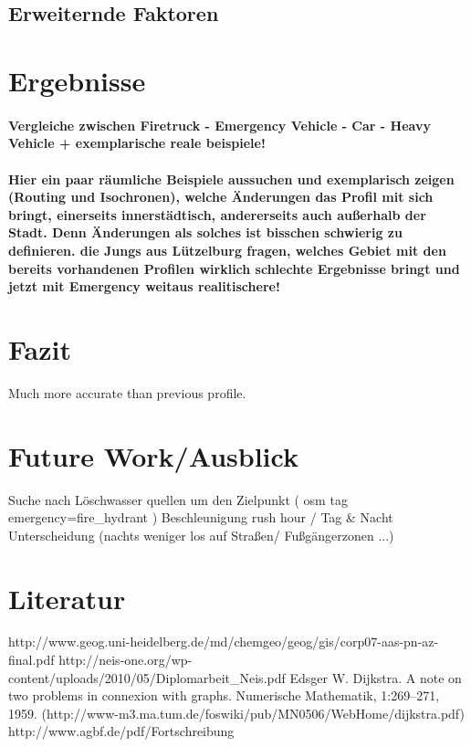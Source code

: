 \documentclass[10pt,a4paper]{article}
\begin{document}
\subsection{Erweiternde Faktoren}

\section{Ergebnisse}
\paragraph{
Vergleiche zwischen Firetruck - Emergency Vehicle - Car - Heavy Vehicle
+ exemplarische reale beispiele!
}
\paragraph{
\color{red}
Hier ein paar räumliche Beispiele aussuchen und exemplarisch zeigen (Routing und Isochronen), welche Änderungen das Profil mit sich bringt, einerseits innerstädtisch, andererseits auch außerhalb der Stadt. Denn Änderungen als solches ist bisschen schwierig zu definieren. die Jungs aus Lützelburg fragen, welches Gebiet mit den bereits vorhandenen Profilen wirklich schlechte Ergebnisse bringt und jetzt mit Emergency weitaus realitischere!
}

\section{Fazit}

Much more accurate than previous profile. 

\section{Future Work/Ausblick}

Suche nach Löschwasser quellen um den Zielpunkt ( osm tag emergency=fire_hydrant )
Beschleunigung
rush hour / Tag & Nacht Unterscheidung (nachts weniger los auf Straßen/ Fußgängerzonen ...)



\section{Literatur}

http://www.geog.uni-heidelberg.de/md/chemgeo/geog/gis/corp07-aas-pn-az-final.pdf
http://neis-one.org/wp-content/uploads/2010/05/Diplomarbeit_Neis.pdf
Edsger W. Dijkstra. A note on two problems in connexion with graphs. Numerische Mathematik,
1:269–271, 1959. (http://www-m3.ma.tum.de/foswiki/pub/MN0506/WebHome/dijkstra.pdf)
http://www.agbf.de/pdf/Fortschreibung%
\end{document}
